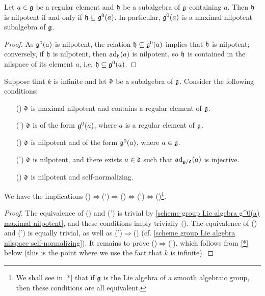 \begin{corollary}\label{scheme group Lie algebra g^0(a) maximal nilpotent}
Let $a\in\mathfrak{g}$ be a regular element and $\mathfrak{h}$ be a subalgebra of $\mathfrak{g}$ containing $a$. Then $\mathfrak{h}$ is nilpotent if and only if $\mathfrak{h}\subseteq\mathfrak{g}^0(a)$. In particular, $\mathfrak{g}^0(a)$ is a maximal nilpotent subalgebra of $\mathfrak{g}$.
\end{corollary}
\begin{proof}
As $\mathfrak{g}^0(a)$ is nilpotent, the relation $\mathfrak{h}\subseteq\mathfrak{g}^0(a)$ implies that $\mathfrak{h}$ is nilpotent; conversely, if $\mathfrak{h}$ is nilpotent, then $\mathrm{ad}_{\mathfrak{h}}(a)$ is nilpotent, so $\mathfrak{h}$ is contained in the nilspace of its element $a$, i.e. $\mathfrak{h}\subseteq\mathfrak{g}^0(a)$.
\end{proof}

\begin{proposition}\label{scheme group Lie subalgebra maximal nilpotent contain regular iff}
Suppose that $k$ is infinite and let $\mathfrak{d}$ be a subalgebra of $\mathfrak{g}$. Consider the following conditions:
\begin{enumerate}
    \item[(\rmnum{1})] $\mathfrak{d}$ is maximal nilpotent and contains a regular element of $\mathfrak{g}$.
    \item[(\rmnum{1}')] $\mathfrak{d}$ is of the form $\mathfrak{g}^0(a)$, where $a$ is a regular element of $\mathfrak{g}$.
    \item[(\rmnum{2})] $\mathfrak{d}$ is nilpotent and of the form $\mathfrak{g}^0(a)$, where $a\in\mathfrak{g}$.
    \item[(\rmnum{2}')] $\mathfrak{d}$ is nilpotent, and there exists $a\in\mathfrak{d}$ such that $\mathrm{ad}_{\mathfrak{g}/\mathfrak{d}}(a)$ is injective.
    \item[(\rmnum{3})] $\mathfrak{d}$ is nilpotent and self-normalizing.
\end{enumerate}
We have the implications ()$\Leftrightarrow$(')$\Rightarrow$()$\Leftrightarrow$(')$\Leftrightarrow$()\footnote{We shall see in \cref{*} that if $\mathfrak{g}$ is the Lie algebra of a smooth algebraic group, then these conditions are all equivalent.}.
\end{proposition}
\begin{proof}
The equivalence of () and (') is trivial by \cref{scheme group Lie algebra g^0(a) maximal nilpotent}, and these conditions imply trivially (). The equivalence of () and (') is equally trivial, as well as (')$\Rightarrow$() (cf. \cref{scheme group Lie algebra nilspace self-normalizing}). It remains to prove ()$\Rightarrow$('), which follows from \cref{*} below (this is the point where we use the fact that $k$ is infinite).
\end{proof}

